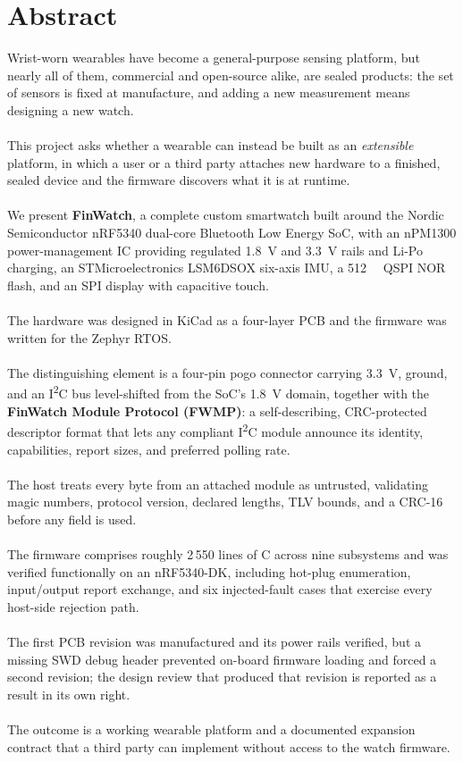 \documentclass[12pt, a4paper]{article}
\begin{document}
\newpage
\section*{Abstract}

Wrist-worn wearables have become a general-purpose sensing platform, but nearly
all of them, commercial and open-source alike, are sealed products: the set
of sensors is fixed at manufacture, and adding a new measurement means designing
a new watch.\\\\
This project asks whether a wearable can instead be built as an
\emph{extensible} platform, in which a user or a third party attaches new
hardware to a finished, sealed device and the firmware discovers what it is at
runtime.\\\\
We present \textbf{FinWatch}, a complete custom smartwatch built around the
Nordic Semiconductor nRF5340 dual-core Bluetooth Low Energy SoC, with an
nPM1300 power-management IC providing regulated \SI{1.8}{\volt} and
\SI{3.3}{\volt} rails and Li-Po charging, an STMicroelectronics LSM6DSOX
six-axis IMU, a
\SI{512}{\mega\bit} QSPI NOR flash, and an SPI display with capacitive touch.\\\\
The hardware was designed in KiCad as a four-layer PCB and the firmware was
written for the Zephyr RTOS.\\\\
The distinguishing element is a four-pin pogo
connector carrying \SI{3.3}{\volt}, ground, and an I\textsuperscript{2}C bus
level-shifted from the SoC's \SI{1.8}{\volt} domain, together with the
\textbf{FinWatch Module Protocol (FWMP)}: a self-describing, CRC-protected
descriptor format that lets any compliant I\textsuperscript{2}C module announce
its identity, capabilities, report sizes, and preferred polling rate.\\\\
The host treats every byte from an attached module as untrusted, validating magic
numbers, protocol version, declared lengths, TLV bounds, and a CRC-16 before any
field is used.\\\\
The firmware comprises roughly 2\,550 lines of C across nine subsystems and was
verified functionally on an nRF5340-DK, including hot-plug enumeration,
input/output report exchange, and six injected-fault cases that exercise every
host-side rejection path.\\\\
The first PCB revision was manufactured and its power
rails verified, but a missing SWD debug header prevented on-board firmware
loading and forced a second revision; the design review that produced that
revision is reported as a result in its own right.\\\\
The outcome is a working wearable platform and a documented expansion contract that a third party can
implement without access to the watch firmware.
\end{document}

